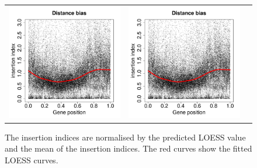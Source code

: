 \documentclass[a4paper,10pt, twocolumn]{article}
\begin{document}
\begin{figure}
\begin{tabular}{c c c}
\includegraphics[page=23, scale=0.22]{biases.pdf} &
\includegraphics[page=25, scale=0.22]{biases.pdf}
\end{tabular}
\caption{The insertion indices are normalised by the predicted LOESS value and the mean of the insertion indices. The red curves show the fitted LOESS curves.}
\label{fig:normalised_distance_bias}
\end{figure}
\end{document}
